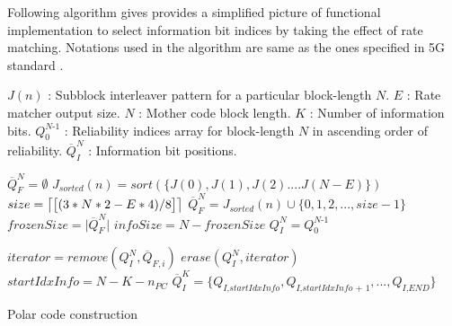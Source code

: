 Following algorithm gives provides a simplified picture of functional implementation to select information bit indices by taking the effect of rate matching. 
Notations used in the algorithm are same as the ones specified in 5G standard \cite{3gpp.38.212}.

$J(n)$ : Subblock interleaver pattern for a particular block-length $N$. \newline
$E$    : Rate matcher output size. \newline
$N$	   : Mother code block length. \newline
$K$	   : Number of information bits.\newline
$Q_{\textit{0}}^{\textit{N-1}}$ : Reliability indices array for block-length $N$ in ascending order of reliability. \newline
$\overline{Q}_{\textit{I}}^{\textit{N}}$ : Information bit positions. \newline


\IncMargin{1.5em}
\begin{algorithm}[!h]
	$\overline{Q}_{\textit{F}}^{\textit{N}} = \emptyset$ \;
	 {
		 {   %
			$J_{sorted}(n) = sort(\{J(0),J(1),J(2)....J(N-E)\})$\;  \label{line:subblockRef1}
			 {
				$size = \ceil*{\big[(3*N*2 - E*4)/8\big]}$\;
				$\overline{Q}_{F}^{N} = J_{sorted}(n) \cup \{0,1,2, ... ,size-1\}$ \label{line:subblockRef2}
			} 	
		} 
	}
	$frozenSize = \big|\overline{Q}_{F}^{N}\big|$ \;
	$infoSize = N - frozenSize$ \;
	$Q_{\textit{I}}^{\textit{N}} = Q_{\textit{0}}^{\textit{N-1}}$ \;
	
	 {
		$iterator = remove(Q_{\textit{I}}^{\textit{N}},\overline{Q}_{F,i})$ \;
		$erase(Q_{\textit{I}}^{\textit{N}},iterator)$ \;
	}
	$startIdxInfo = N - K - n_{PC}$ \;
	$\overline{Q}_{\textit{I}}^{\textit{K}} = \{Q_{\textit{I,startIdxInfo}},Q_{\textit{I,startIdxInfo + 1}},...,Q_{\textit{I,END}}\}$
	\caption{Polar code construction}
	\label{algo:polarCodeConstuctionAlgo}
\end{algorithm}
\DecMargin{1.5em}

